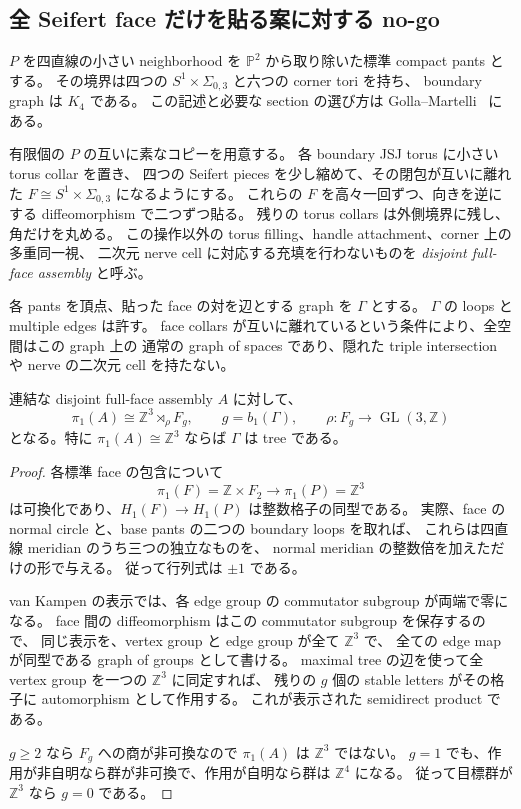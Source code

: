\subsection{全 Seifert face だけを貼る案に対する no-go}

$P$ を四直線の小さい neighborhood を $\mathbb P^2$ から取り除いた標準 compact pants とする。
その境界は四つの $S^1\times\Sigma_{0,3}$ と六つの corner tori を持ち、
boundary graph は $K_4$ である。
この記述と必要な section の選び方は
Golla--Martelli~\cite[\S4.2]{GollaMartelli} にある。

\begin{definition}
\label{cs6:assemblydef}
有限個の $P$ の互いに素なコピーを用意する。
各 boundary JSJ torus に小さい torus collar を置き、
四つの Seifert pieces を少し縮めて、その閉包が互いに離れた
$F\cong S^1\times\Sigma_{0,3}$ になるようにする。
これらの $F$ を高々一回ずつ、向きを逆にする diffeomorphism で二つずつ貼る。
残りの torus collars は外側境界に残し、角だけを丸める。
この操作以外の torus filling、handle attachment、corner 上の多重同一視、
二次元 nerve cell に対応する充填を行わないものを
\emph{disjoint full-face assembly} と呼ぶ。

各 pants を頂点、貼った face の対を辺とする graph を $\Gamma$ とする。
$\Gamma$ の loops と multiple edges は許す。
face collars が互いに離れているという条件により、全空間はこの graph 上の
通常の graph of spaces であり、隠れた triple intersection や nerve の二次元 cell を持たない。
\end{definition}

\begin{lemma}
\label{cs6:assemblypi}
連結な disjoint full-face assembly $A$ に対して、
\[
 \pi_1(A)\cong\mathbb Z^3\rtimes_\rho F_g,
 \qquad g=b_1(\Gamma),\qquad
 \rho:F_g\longrightarrow\operatorname{GL}(3,\mathbb Z)
\]
となる。特に $\pi_1(A)\cong\mathbb Z^3$ ならば $\Gamma$ は tree である。
\end{lemma}

\begin{proof}
各標準 face の包含について
\[
 \pi_1(F)=\mathbb Z\times F_2\longrightarrow\pi_1(P)=\mathbb Z^3
\]
は可換化であり、$H_1(F)\to H_1(P)$ は整数格子の同型である。
実際、face の normal circle と、base pants の二つの boundary loops を取れば、
これらは四直線 meridian のうち三つの独立なものを、
normal meridian の整数倍を加えただけの形で与える。
従って行列式は $\pm1$ である。

van Kampen の表示では、各 edge group の commutator subgroup が両端で零になる。
face 間の diffeomorphism はこの commutator subgroup を保存するので、
同じ表示を、vertex group と edge group が全て $\mathbb Z^3$ で、
全ての edge map が同型である graph of groups として書ける。
maximal tree の辺を使って全 vertex group を一つの $\mathbb Z^3$ に同定すれば、
残りの $g$ 個の stable letters がその格子に automorphism として作用する。
これが表示された semidirect product である。

$g\geq2$ なら $F_g$ への商が非可換なので $\pi_1(A)$ は $\mathbb Z^3$ ではない。
$g=1$ でも、作用が非自明なら群が非可換で、作用が自明なら群は $\mathbb Z^4$ になる。
従って目標群が $\mathbb Z^3$ なら $g=0$ である。
\end{proof}

